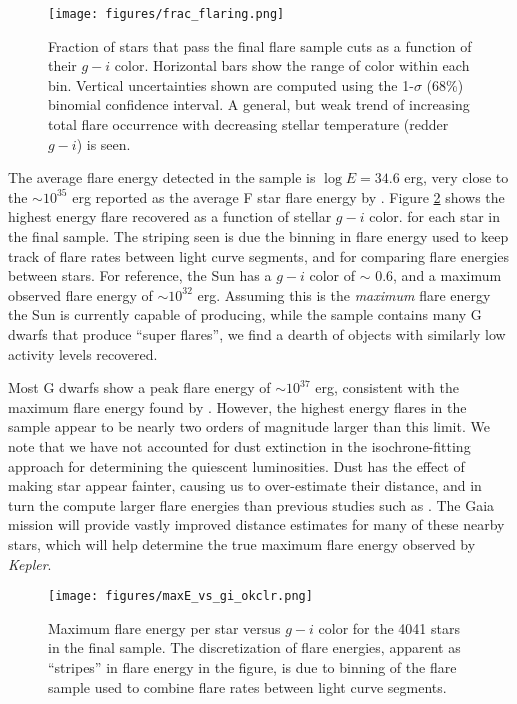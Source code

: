 \documentclass[twocolumn]{aastex6}
\newcommand{\Kepler}{\textsl{Kepler}\xspace}
\begin{document}
\begin{figure}[!t]
\centering
\texttt{[image: figures/frac\_flaring.png]}
\caption{
Fraction of stars that pass the final flare sample cuts as a function of their $g-i$ color. Horizontal bars show the range of color within each bin. Vertical uncertainties shown are computed using the 1-$\sigma$ (68\%) binomial confidence interval. A general, but weak trend of increasing total flare occurrence with decreasing stellar temperature (redder $g-i$) is seen.
}
\label{fig:Nvsgi}
\end{figure}



The average flare energy detected in the sample is $\log E = 34.6$ erg, very close to the $\sim10^{35}$ erg reported as the average F star flare energy by \citet{balona2012}. Figure \ref{fig:maxcolor} shows the highest energy flare recovered as a function of stellar  $g-i$ color. for each star in the final sample. The striping seen is due the binning in flare energy used to keep track of flare rates between light curve segments, and for comparing flare energies between stars. For reference, the Sun has a $g-i$ color of $\sim$ 0.6, and a maximum observed flare energy of $\sim10^{32}$ erg.  Assuming this is the {\it maximum} flare energy the Sun is currently capable of producing,  while the sample contains many G dwarfs that produce ``super flares'', we find a dearth of objects with similarly low activity levels recovered.

Most G dwarfs show a peak flare energy of $\sim10^{37}$ erg, consistent with the maximum flare energy found by \citet{wu2015}. However, the highest energy flares in the sample appear to be nearly two orders of magnitude larger than this limit. We note that we have not accounted for dust extinction in the isochrone-fitting approach for determining the quiescent luminosities. Dust has the effect of making star appear fainter, causing us to over-estimate their distance, and in turn the compute larger flare energies than previous studies such as \citet{maehara2015}. The Gaia mission \citep{eyer2013} will provide vastly improved distance estimates for many of these nearby stars, which will help determine the true maximum flare energy observed by \Kepler.



\begin{figure}[!t]
\centering
\texttt{[image: figures/maxE\_vs\_gi\_okclr.png]}
\caption{
Maximum flare energy per star versus $g-i$ color for the 4041 stars in the final sample. The discretization of flare energies, apparent as ``stripes'' in flare energy in the figure, is due to binning of the flare sample used to combine flare rates between light curve segments.
}
\label{fig:maxcolor}
\end{figure}
\end{document}
